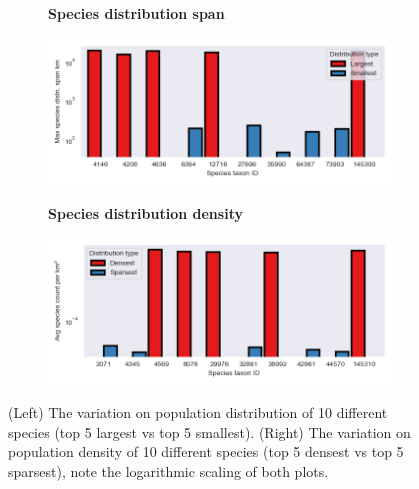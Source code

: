 \begin{figure}[hbt!]
\centering

\begin{subfigure}{.45\linewidth}
\vspace*{-1ex}  
\begin{center}
\textbf{Species distribution span}
\end{center}
\vspace*{-1ex}
  \includegraphics[width=\linewidth]{Images/large_small.png}
\end{subfigure}
\begin{subfigure}{.45\linewidth}
\vspace*{-1ex}  
\begin{center}
\textbf{Species distribution density}
\end{center}
\vspace*{-1ex}
  \includegraphics[width=\linewidth]{Images/dense_sparse.png}
\end{subfigure} %

\caption{(Left) The variation on population distribution of 10 different species (top 5 largest vs top 5 smallest). (Right) The variation on population density of 10 different species (top 5 densest vs top 5 sparsest), note the logarithmic scaling of both plots.}
\label{fig:dist}
\end{figure}

